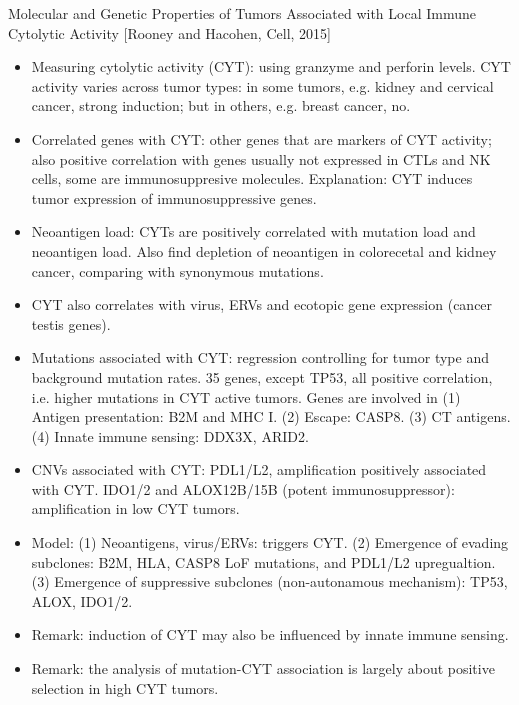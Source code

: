 \documentclass{report}
\begin{document}
Molecular and Genetic Properties of Tumors Associated with Local Immune Cytolytic Activity [Rooney and Hacohen, Cell, 2015]
\begin{itemize}
	
	\item Measuring cytolytic activity (CYT): using granzyme and perforin levels. CYT activity varies across tumor types: in some tumors, e.g. kidney and cervical cancer, strong induction; but in others, e.g. breast cancer, no. 
	
	\item Correlated genes with CYT: other genes that are markers of CYT activity; also positive correlation with genes usually not expressed in CTLs and NK cells, some are immunosuppresive molecules. Explanation: CYT induces tumor expression of immunosuppressive genes. 
	
	\item Neoantigen load: CYTs are positively correlated with mutation load and neoantigen load. Also find depletion of neoantigen in colorecetal and kidney cancer, comparing with synonymous mutations.
	
	\item CYT also correlates with virus, ERVs and ecotopic gene expression (cancer testis genes). 
	
	\item Mutations associated with CYT: regression controlling for tumor type and background mutation rates. 35 genes, except TP53, all positive correlation, i.e. higher mutations in CYT active tumors. Genes are involved in (1) Antigen presentation: B2M and MHC I. (2) Escape: CASP8. (3) CT antigens. (4) Innate immune sensing: DDX3X, ARID2. 
	
	\item CNVs associated with CYT: PDL1/L2, amplification positively associated with CYT. IDO1/2 and ALOX12B/15B (potent immunosuppressor): amplification in low CYT tumors. 
	
	\item Model: (1) Neoantigens, virus/ERVs: triggers CYT. (2) Emergence of evading subclones: B2M, HLA, CASP8 LoF mutations, and PDL1/L2 upregualtion. (3) Emergence of suppressive subclones (non-autonamous mechanism): TP53, ALOX, IDO1/2. 
	
	\item Remark: induction of CYT may also be influenced by innate immune sensing. 
	
	\item Remark: the analysis of mutation-CYT association is largely about positive selection in high CYT tumors. 
\end{itemize}
\end{document}
